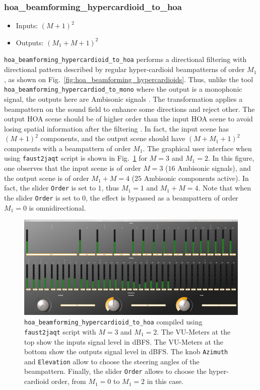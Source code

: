 \documentclass[10pt,a4paper]{article}
\begin{document}
\subsubsection{hoa\_beamforming\_hypercardioid\_to\_hoa}
\begin{itemize}
\item Inputs: $(M+1)^2$
\item Outputs: $(M_1+M+1)^2$
\end{itemize}
\lstinline'hoa_beamforming_hypercardioid_to_hoa' performs a directional filtering with directional pattern described by regular hyper-cardioid beampatterns of order $M_1$, as shown on Fig.~\ref{fig:hoa_beamforming_hypercardioids}. Thus, unlike the tool \\ \lstinline'hoa_beamforming_hypercardiod_to_mono' where the output is a monophonic signal, the outputs here are Ambisonic signals \cite{lecomte2016filtrage}. The transformation applies a beampattern on the sound field to enhance some directions and reject other. The output HOA scene should be of higher order than the input HOA scene to avoid losing spatial information after the filtering \cite{lecomte2016filtrage}. In fact, the input scene has $(M+1)^2$ components, and the output scene should have $(M+M_1+1)^2$ components with a beampattern of order $M_1$. The graphical user interface when using \lstinline'faust2jaqt' script is shown in Fig.~\ref{fig:hoa_beamforming_hypercardioid_to_hoa} for $M=3$ and $M_1=2$. In this figure, one observes that the input scene is of order $M=3$ ($16$ Ambisonic signals), and the output scene is of order $M_1+M=4$ ($25$ Ambisonic components active). In fact, the slider \lstinline'Order' is set to $1$, thus $M_1=1$ and $M_1+M=4$. Note that when the slider \lstinline'Order' is set to $0$, the effect is bypassed as a beampattern of order $M_1=0$ is omnidirectional.
\begin{figure}[!ht]
\centering
\includegraphics[width=\columnwidth]{hoa_beamforming_hypercardioid_to_hoa.png}
\caption{\lstinline'hoa_beamforming_hypercardioid_to_hoa' compiled using \lstinline'faust2jaqt' script with $M=3$ and $M_1=2$. The VU-Meters at the top show the inputs signal level in dBFS. The VU-Meters at the bottom show the outputs signal level in dBFS. The knob \lstinline'Azimuth' and \lstinline'Elevation' allow to choose the steering angles of the beampattern. Finally, the slider \lstinline'Order' allows to choose the hyper-cardioid order, from $M_1=0$ to $M_1=2$ in this case.}
\label{fig:hoa_beamforming_hypercardioid_to_hoa}
\end{figure}
\end{document}
